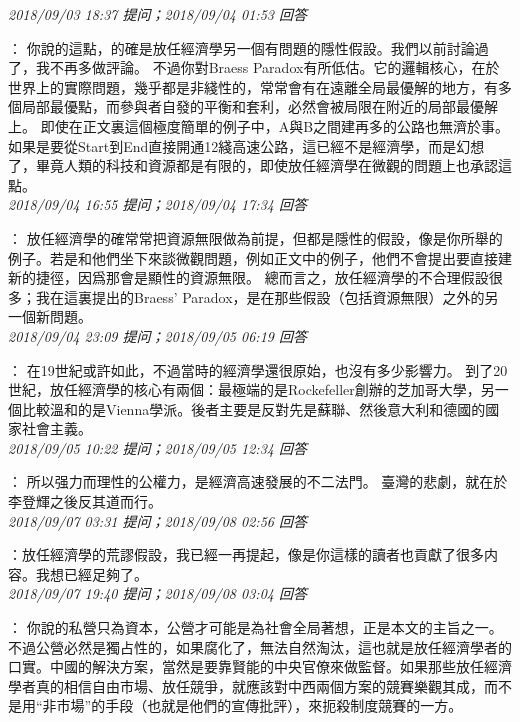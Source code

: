 \documentclass[twocolumn]{ctexart}
\begin{document}
\textit{\hfill\noindent\small 2018/09/03 18:37 提问；2018/09/04 01:53 回答}

：
你說的這點，的確是放任經濟學另一個有問題的隱性假設。我們以前討論過了，我不再多做評論。
不過你對Braess Paradox有所低估。它的邏輯核心，在於世界上的實際問題，幾乎都是非綫性的，常常會有在遠離全局最優解的地方，有多個局部最優點，而參與者自發的平衡和套利，必然會被局限在附近的局部最優解上。
即使在正文裏這個極度簡單的例子中，A與B之間建再多的公路也無濟於事。如果是要從Start到End直接開通12綫高速公路，這已經不是經濟學，而是幻想了，畢竟人類的科技和資源都是有限的，即使放任經濟學在微觀的問題上也承認這點。
\\

\textit{\hfill\noindent\small 2018/09/04 16:55 提问；2018/09/04 17:34 回答}

：
放任經濟學的確常常把資源無限做為前提，但都是隱性的假設，像是你所舉的例子。若是和他們坐下來談微觀問題，例如正文中的例子，他們不會提出要直接建新的捷徑，因爲那會是顯性的資源無限。
總而言之，放任經濟學的不合理假設很多；我在這裏提出的Braess' Paradox，是在那些假設（包括資源無限）之外的另一個新問題。
\\

\textit{\hfill\noindent\small 2018/09/04 23:09 提问；2018/09/05 06:19 回答}

：
在19世紀或許如此，不過當時的經濟學還很原始，也沒有多少影響力。
到了20世紀，放任經濟學的核心有兩個：最極端的是Rockefeller創辦的芝加哥大學，另一個比較溫和的是Vienna學派。後者主要是反對先是蘇聯、然後意大利和德國的國家社會主義。
\\

\textit{\hfill\noindent\small 2018/09/05 10:22 提问；2018/09/05 12:34 回答}

：
所以强力而理性的公權力，是經濟高速發展的不二法門。
臺灣的悲劇，就在於李登輝之後反其道而行。
\\

\textit{\hfill\noindent\small 2018/09/07 03:31 提问；2018/09/08 02:56 回答}

：放任經濟學的荒謬假設，我已經一再提起，像是你這樣的讀者也貢獻了很多内容。我想已經足夠了。
\\

\textit{\hfill\noindent\small 2018/09/07 19:40 提问；2018/09/08 03:04 回答}

：
你說的私營只為資本，公營才可能是為社會全局著想，正是本文的主旨之一。
不過公營必然是獨占性的，如果腐化了，無法自然淘汰，這也就是放任經濟學者的口實。中國的解決方案，當然是要靠賢能的中央官僚來做監督。如果那些放任經濟學者真的相信自由市場、放任競爭，就應該對中西兩個方案的競賽樂觀其成，而不是用“非市場”的手段（也就是他們的宣傳批評），來扼殺制度競賽的一方。
\\
\end{document}

